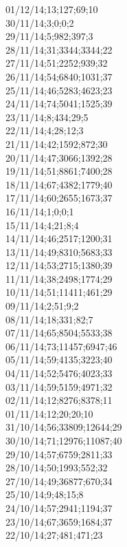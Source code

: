 01/12/14;13;127;69;10 \\
30/11/14;3;0;0;2 \\
29/11/14;5;982;397;3 \\
28/11/14;31;3344;3344;22 \\
27/11/14;51;2252;939;32 \\
26/11/14;54;6840;1031;37 \\
25/11/14;46;5283;4623;23 \\
24/11/14;74;5041;1525;39 \\
23/11/14;8;434;29;5 \\
22/11/14;4;28;12;3 \\
21/11/14;42;1592;872;30 \\
20/11/14;47;3066;1392;28 \\
19/11/14;51;8861;7400;28 \\
18/11/14;67;4382;1779;40 \\
17/11/14;60;2655;1673;37 \\
16/11/14;1;0;0;1 \\
15/11/14;4;21;8;4 \\
14/11/14;46;2517;1200;31 \\
13/11/14;49;8310;5683;33 \\
12/11/14;53;2715;1380;39 \\
11/11/14;38;2498;1774;29 \\
10/11/14;51;11411;461;29 \\
09/11/14;2;51;9;2 \\
08/11/14;18;331;82;7 \\
07/11/14;65;8504;5533;38 \\
06/11/14;73;11457;6947;46 \\
05/11/14;59;4135;3223;40 \\
04/11/14;52;5476;4023;33 \\
03/11/14;59;5159;4971;32 \\
02/11/14;12;8276;8378;11 \\
01/11/14;12;20;20;10 \\
31/10/14;56;33809;12644;29 \\
30/10/14;71;12976;11087;40 \\
29/10/14;57;6759;2811;33 \\
28/10/14;50;1993;552;32 \\
27/10/14;49;36877;670;34 \\
25/10/14;9;48;15;8 \\
24/10/14;57;2941;1194;37 \\
23/10/14;67;3659;1684;37 \\
22/10/14;27;481;471;23 \\
